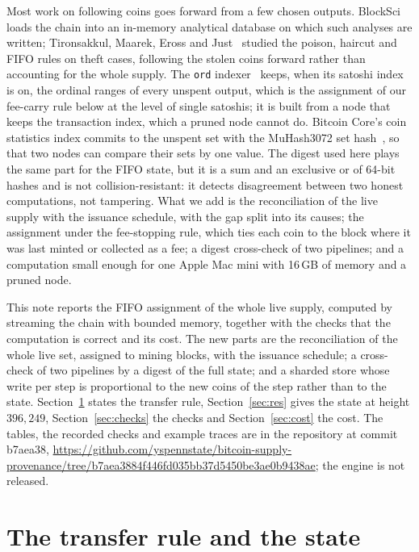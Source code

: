 \documentclass[11pt]{amsart}
\begin{document}
Most work on following coins goes forward from a few chosen outputs. BlockSci~\cite{BlockSci} loads the chain into an in-memory analytical database on which such analyses are written; Tironsakkul, Maarek, Eross and Just~\cite{TMEJ19} studied the poison, haircut and FIFO rules on theft cases, following the stolen coins forward rather than accounting for the whole supply. The \texttt{ord} indexer~\cite{Ord} keeps, when its satoshi index is on, the ordinal ranges of every unspent output, which is the assignment of our fee-carry rule below at the level of single satoshis; it is built from a node that keeps the transaction index, which a pruned node cannot do. Bitcoin Core's coin statistics index commits to the unspent set with the MuHash3072 set hash~\cite{CoreMuHash}, so that two nodes can compare their sets by one value. The digest used here plays the same part for the FIFO state, but it is a sum and an exclusive or of 64-bit hashes and is not collision-resistant: it detects disagreement between two honest computations, not tampering. What we add is the reconciliation of the live supply with the issuance schedule, with the gap split into its causes; the assignment under the fee-stopping rule, which ties each coin to the block where it was last minted or collected as a fee; a digest cross-check of two pipelines; and a computation small enough for one Apple Mac mini with 16\,GB of memory and a pruned node.

This note reports the FIFO assignment of the whole live supply, computed by streaming the chain with bounded memory, together with the checks that the computation is correct and its cost. The new parts are the reconciliation of the whole live set, assigned to mining blocks, with the issuance schedule; a cross-check of two pipelines by a digest of the full state; and a sharded store whose write per step is proportional to the new coins of the step rather than to the state. Section~\ref{sec:rule} states the transfer rule, Section~\ref{sec:res} gives the state at height $396{,}249$, Section~\ref{sec:checks} the checks and Section~\ref{sec:cost} the cost. The tables, the recorded checks and example traces are in the repository at commit b7aea38, \url{https://github.com/yspennstate/bitcoin-supply-provenance/tree/b7aea3884f446fd035bb37d5450be3ae0b9438ae}; the engine is not released.

\section{The transfer rule and the state}\label{sec:rule}
\end{document}

